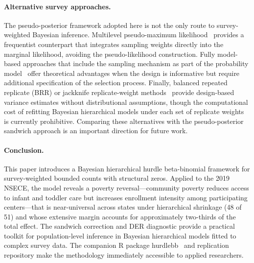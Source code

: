 \paragraph{Alternative survey approaches.}
The pseudo-posterior framework adopted here is not the only route to
survey-weighted Bayesian inference.  Multilevel pseudo-maximum
likelihood~\citep[MPML;][]{RabeHeskethSkrondal2006} provides a
frequentist counterpart that integrates sampling weights directly into
the marginal likelihood, avoiding the pseudo-likelihood construction.
Fully model-based approaches that include the sampling mechanism as part
of the probability model~\citep{SiEtAl2020} offer theoretical
advantages when the design is informative but require additional
specification of the selection process.  Finally, balanced repeated
replicate (BRR) or jackknife replicate-weight
methods~\citep{RaoWu1988} provide design-based variance estimates
without distributional assumptions, though the computational cost of
refitting Bayesian hierarchical models under each set of replicate
weights is currently prohibitive.  Comparing these alternatives with
the pseudo-posterior sandwich approach is an important direction for
future work.

\paragraph{Conclusion.}
This paper introduces a Bayesian hierarchical hurdle beta-binomial
framework for survey-weighted bounded counts with structural zeros.
Applied to the 2019 NSECE, the model reveals a poverty reversal---community
poverty reduces access to infant and toddler care but increases
enrollment intensity among participating centers---that is
near-universal across states under hierarchical shrinkage (48 of 51)
and whose extensive margin accounts for approximately two-thirds of
the total effect.  The sandwich correction and DER diagnostic provide
a practical toolkit for population-level inference in Bayesian
hierarchical models fitted to complex survey data.  The companion R
package \textsf{hurdlebb}~\citep{hurdlebb2026} and replication
repository make the methodology immediately accessible to applied
researchers.

